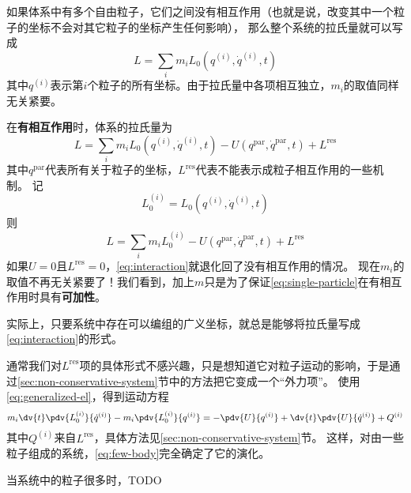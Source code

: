 如果体系中有多个自由粒子，它们之间没有相互作用（也就是说，改变其中一个粒子的坐标不会对其它粒子的坐标产生任何影响），
那么整个系统的拉氏量就可以写成
\[
    L = \sum_i m_i L_0(q^{(i)}, \dot{q}^{(i)}, t)
\]
其中$q^{(i)}$表示第$i$个粒子的所有坐标。由于拉氏量中各项相互独立，$m_i$的取值同样无关紧要。

在\textbf{有相互作用}时，体系的拉氏量为
\[
    L = \sum_i m_i L_0(q^{(i)}, \dot{q}^{(i)}, t) - U(q^{\text{par}}, \dot{q}^{\text{par}}, t) + L^{\text{res}}
\]
其中$q^\text{par}$代表所有关于粒子的坐标，$L^\text{res}$代表不能表示成粒子相互作用的一些机制。
记
\begin{equation}
    L^{(i)}_0 = L_0(q^{(i)}, \dot{q}^{(i)}, t)
\end{equation}
则
\begin{equation}
    L = \sum_i m_i L_0^{(i)} - U(q^{\text{par}}, \dot{q}^{\text{par}}, t) + L^{\text{res}}
    \label{eq:interaction}
\end{equation}
如果$U=0$且$L^\text{res}=0$，\eqref{eq:interaction}就退化回了没有相互作用的情况。
现在$m_i$的取值不再无关紧要了！我们看到，加上$m$只是为了保证\eqref{eq:single-particle}在有相互作用时具有\textbf{可加性}。

实际上，只要系统中存在可以编组的广义坐标，就总是能够将拉氏量写成\eqref{eq:interaction}的形式。

通常我们对$L^\text{res}$项的具体形式不感兴趣，只是想知道它对粒子运动的影响，于是通过\ref{sec:non-conservative-system}节中的方法把它变成一个“外力项”。
使用\eqref{eq:generalized-el}，得到运动方程
\begin{equation}
    m_i \dv{t} \pdv{L_0^{(i)}}{\dot{q}^{(i)}} - m_i \pdv{L^{(i)}_0}{q^{(i)}} = - \pdv{U}{q^{(i)}} + \dv{t} \pdv{U}{\dot{q}^{(i)}} + Q^{(i)}
    \label{eq:few-body}
\end{equation}
其中$Q^{(i)}$来自$L^\text{res}$，具体方法见\ref{sec:non-conservative-system}节。
这样，对由一些粒子组成的系统，\eqref{eq:few-body}完全确定了它的演化。

当系统中的粒子很多时，TODO


